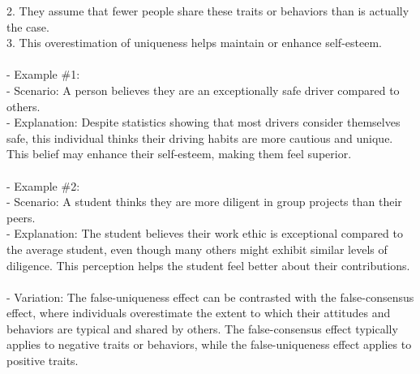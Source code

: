 \documentclass[a4paper,12pt,single,pdftex]{scrartcl}
\begin{document}
    
        2. They assume that fewer people share these traits or behaviors than is actually the case.
    \\

    
        3. This overestimation of uniqueness helps maintain or enhance self-esteem.
    \\

    
      
    \\

    
      - Example \#1:
    \\

    
        - Scenario: A person believes they are an exceptionally safe driver compared to others.
    \\

    
        - Explanation: Despite statistics showing that most drivers consider themselves safe, this individual thinks their driving habits are more cautious and unique. This belief may enhance their self-esteem, making them feel superior.
    \\

    
      
    \\

    
      - Example \#2:
    \\

    
        - Scenario: A student thinks they are more diligent in group projects than their peers.
    \\

    
        - Explanation: The student believes their work ethic is exceptional compared to the average student, even though many others might exhibit similar levels of diligence. This perception helps the student feel better about their contributions.
    \\

    
      
    \\

    
      - Variation: The false-uniqueness effect can be contrasted with the false-consensus effect, where individuals overestimate the extent to which their attitudes and behaviors are typical and shared by others. The false-consensus effect typically applies to negative traits or behaviors, while the false-uniqueness effect applies to positive traits.
    \\

    
      
    \\
\end{document}
